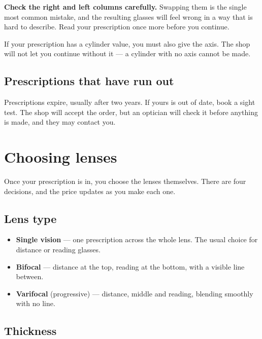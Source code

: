 \documentclass[11pt,a4paper]{report}
\begin{document}
\begin{warnbox}
\textbf{Check the right and left columns carefully.} Swapping them is
the single most common mistake, and the resulting glasses will feel
wrong in a way that is hard to describe. Read your prescription once
more before you continue.
\end{warnbox}

If your prescription has a cylinder value, you must also give the axis.
The shop will not let you continue without it --- a cylinder with no
axis cannot be made.

\section{Prescriptions that have run out}

Prescriptions expire, usually after two years. If yours is out of date,
book a sight test. The shop will accept the order, but an optician will
check it before anything is made, and they may contact you.

\chapter{Choosing lenses}

Once your prescription is in, you choose the lenses themselves. There
are four decisions, and the price updates as you make each one.

\section{Lens type}

\begin{itemize}
  \item \textbf{Single vision} --- one prescription across the whole
        lens. The usual choice for distance or reading glasses.
  \item \textbf{Bifocal} --- distance at the top, reading at the bottom,
        with a visible line between.
  \item \textbf{Varifocal} (progressive) --- distance, middle and
        reading, blending smoothly with no line.
\end{itemize}

\section{Thickness}
\end{document}
